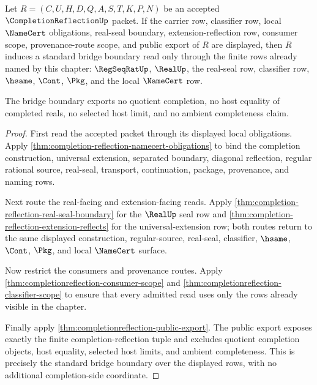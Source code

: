 \begin{theorem}
\label{thm:completion-reflection-standard-bridge-boundary}
Let $R=(C,U,H,D,Q,A,S,T,K,P,N)$ be an accepted $\CompletionReflectionUp$ packet. If the carrier row, classifier row, local $\NameCert$ obligations, real-seal boundary, extension-reflection row, consumer scope, provenance-route scope, and public export of $R$ are displayed, then $R$ induces a standard bridge boundary read only through the finite rows already named by this chapter: $\RegSeqRatUp$, $\RealUp$, the real-seal row, classifier row, $\hsame$, $\Cont$, $\Pkg$, and the local $\NameCert$ row.

The bridge boundary exports no quotient completion, no host equality of completed reals, no selected host limit, and no ambient completeness claim.
\end{theorem}
\begin{proof}
First read the accepted packet through its displayed local obligations. Apply \autoref{thm:completion-reflection-namecert-obligations} to bind the completion construction, universal extension, separated boundary, diagonal reflection, regular rational source, real-seal, transport, continuation, package, provenance, and naming rows.

Next route the real-facing and extension-facing reads. Apply \autoref{thm:completion-reflection-real-seal-boundary} for the $\RealUp$ seal row and \autoref{thm:completion-reflection-extension-reflects} for the universal-extension row; both routes return to the same displayed construction, regular-source, real-seal, classifier, $\hsame$, $\Cont$, $\Pkg$, and local $\NameCert$ surface.

Now restrict the consumers and provenance routes. Apply \autoref{thm:completionreflection-consumer-scope} and \autoref{thm:completionreflection-classifier-scope} to ensure that every admitted read uses only the rows already visible in the chapter.

Finally apply \autoref{thm:completionreflection-public-export}. The public export exposes exactly the finite completion-reflection tuple and excludes quotient completion objects, host equality, selected host limits, and ambient completeness. This is precisely the standard bridge boundary over the displayed rows, with no additional completion-side coordinate.
\end{proof}

